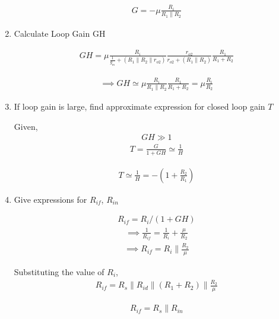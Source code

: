 \begin{enumerate}[label=\thesection.\arabic*.,ref=\thesection.\theenumi]
\begin{align}
    G =-\mu \frac{R_{i}}{R_{1} \parallel R_{2}}
\end{align}


\item
Calculate Loop Gain GH

\solution
\begin{align}
    GH=\mu \frac{R_{i}}{\frac{1}{g_{m}}+(R_{1}\parallel R_{2}\parallel r_{o 2})} \frac{r_{o 2}}{r_{o 2}+(R_{1} \parallel R_{2})} \frac{R_{1}}{R_{1}+R_{2}}
\end{align}

\begin{align}
    \implies GH \simeq \mu \frac{R_{i}}{R_{1} \parallel R_{2}} \frac{R_{1}}{R_{1}+R_{2}}=\mu \frac{R_{i}}{R_{2}}
\end{align}

\item
If loop gain is large, find approximate expression for closed loop gain $T$

\solution
Given,
\begin{align}
    GH \gg 1
\end{align}
\begin{align}
    T = \frac{G}{1+GH}\simeq \frac{1}{H}
\end{align}

\begin{align}
    T \simeq \frac{1}{H}=-\left(1+\frac{R_{2}}{R_{1}}\right)
\end{align}

\item
Give expressions for $R_{if}$, $R_{in}$

\begin{align}
    R_{if}=R_{i} /(1+GH)
\end{align}
\begin{align}
    \implies \frac{1}{R_{i f}}=\frac{1}{R_{i}}+\frac{\mu}{R_{2}}
\end{align}
\begin{align}
    \implies R_{i f}=R_{i} \parallel \frac{R_{2}}{\mu}
\end{align}

Substituting the value of $R_{i}$,
\begin{align}
    R_{if}=R_{s}\parallel R_{id}\parallel(R_{1}+R_{2}) \parallel \frac{R_{2}}{\mu}
\end{align}

\begin{align}
    R_{if}=R_{s} \parallel R_{in}
\end{align}


\end{enumerate}
